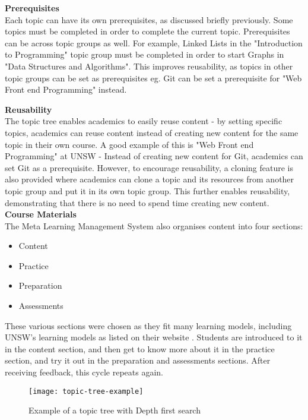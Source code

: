 \textbf{Prerequisites} \\

Each topic can have its own prerequisites, as discussed briefly previously. Some topics must be completed in order to complete the current topic. Prerequisites can be across topic groups as well. For example, Linked Lists in the "Introduction to Programming" topic group must be completed in order to start Graphs in "Data Structures and Algorithms". This improves reusability, as topics in other topic groups can be set as prerequisites eg. Git can be set a prerequisite for "Web Front end Programming" instead.

\textbf{Reusability} \\
The topic tree enables academics to easily reuse content - by setting specific topics, academics can reuse content instead of creating new content for the same topic in their own course. A good example of this is "Web Front end Programming" at UNSW - Instead of creating new content for Git, academics can set Git as a prerequisite. However, to encourage reusability, a cloning feature is also provided where academics can clone a topic and its resources from another topic group and put it in its own topic group. This further enables reusability, demonstrating that there is no need to spend time creating new content.\\

\textbf{Course Materials} \\
The Meta Learning Management System also organises content into four sections:
\begin{itemize}
    \item Content
    \item Practice
    \item Preparation
    \item Assessments
\end{itemize}

These various sections were chosen as they fit many learning models, including UNSW's learning models as listed on their website \cite{learningModel}. Students are introduced to it in the content section, and then get to know more about it in the practice section, and try it out in the preparation and assessments sections. After receiving feedback, this cycle repeats again.\\

\begin{figure}[h!]
    \centering
    \texttt{[image: topic-tree-example]}
    \caption{Example of a topic tree with Depth first search}
\end{figure}


